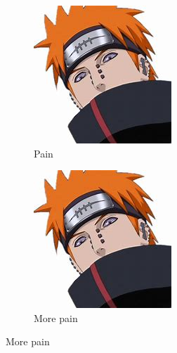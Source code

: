 \documentclass{article}
\begin{document}
	\begin{figure}[h!]
		\centering
		\begin{subfigure}[b]{0.4\linewidth}
			
		\includegraphics[width=\linewidth]{screenshot017}
		\caption{Pain}
    	\end{subfigure}
        \begin{subfigure}[b]{0.6\linewidth}
        	
        \includegraphics[width=\linewidth]{screenshot017}
         \caption{More pain}
         

\end{subfigure}
\end{figure}
\end{document}
